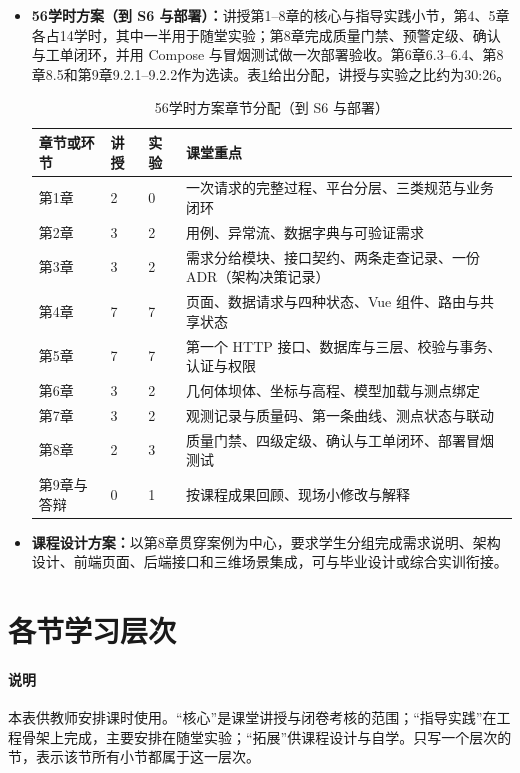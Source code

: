 \begin{itemize}
\item \textbf{56学时方案（到 S6 与部署）：}讲授第1--8章的核心与指导实践小节，第4、5章各占14学时，其中一半用于随堂实验；第8章完成质量门禁、预警定级、确认与工单闭环，并用 Compose 与冒烟测试做一次部署验收。第6章6.3--6.4、第8章8.5和第9章9.2.1--9.2.2作为选读。表\ref{tab:preface-56-hours}给出分配，讲授与实验之比约为30:26。
\begin{table}[htbp]
\centering
\caption{56学时方案章节分配（到 S6 与部署）}
\label{tab:preface-56-hours}
\begin{tabular}{p{2.8cm}p{1.2cm}p{1.2cm}p{7.0cm}}
\toprule
章节或环节 & 讲授 & 实验 & 课堂重点 \\
\midrule
第1章 & 2 & 0 & 一次请求的完整过程、平台分层、三类规范与业务闭环 \\
第2章 & 3 & 2 & 用例、异常流、数据字典与可验证需求 \\
第3章 & 3 & 2 & 需求分给模块、接口契约、两条走查记录、一份 ADR（架构决策记录） \\
第4章 & 7 & 7 & 页面、数据请求与四种状态、Vue 组件、路由与共享状态 \\
第5章 & 7 & 7 & 第一个 HTTP 接口、数据库与三层、校验与事务、认证与权限 \\
第6章 & 3 & 2 & 几何体坝体、坐标与高程、模型加载与测点绑定 \\
第7章 & 3 & 2 & 观测记录与质量码、第一条曲线、测点状态与联动 \\
第8章 & 2 & 3 & 质量门禁、四级定级、确认与工单闭环、部署冒烟测试 \\
第9章与答辩 & 0 & 1 & 按课程成果回顾、现场小修改与解释 \\
\bottomrule
\end{tabular}
\end{table}

\item \textbf{课程设计方案：}以第8章贯穿案例为中心，要求学生分组完成需求说明、架构设计、前端页面、后端接口和三维场景集成，可与毕业设计或综合实训衔接。
\end{itemize}


\section{各节学习层次}\label{online:layers}

\paragraph{说明}本表供教师安排课时使用。“核心”是课堂讲授与闭卷考核的范围；“指导实践”在工程骨架上完成，主要安排在随堂实验；“拓展”供课程设计与自学。只写一个层次的节，表示该节所有小节都属于这一层次。


